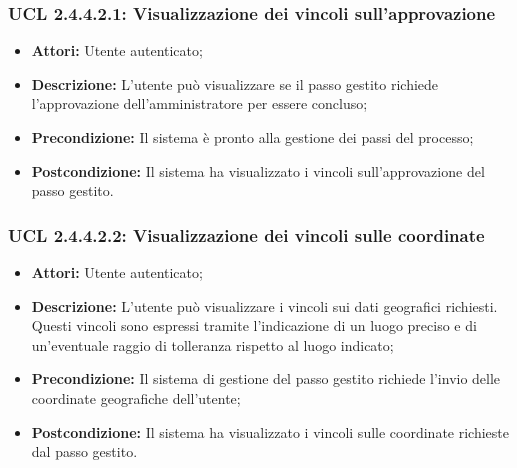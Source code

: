 \hypertarget{L2.4.4.2.1}{}
\subsubsection{UCL 2.4.4.2.1: Visualizzazione dei vincoli sull'approvazione}
\begin{itemize}
\item \textbf{Attori:} Utente autenticato;
\item \textbf{Descrizione:} L'utente può visualizzare se il passo gestito richiede l'approvazione dell'amministratore per essere concluso;
\item \textbf{Precondizione:} Il sistema è pronto alla gestione dei passi del processo;
\item \textbf{Postcondizione:} Il sistema ha visualizzato i vincoli sull'approvazione del passo gestito.
\end{itemize}

\hypertarget{L2.4.4.2.2}{}
\subsubsection{UCL 2.4.4.2.2: Visualizzazione dei vincoli sulle coordinate}
\begin{itemize}
\item \textbf{Attori:} Utente autenticato;
\item \textbf{Descrizione:} L'utente può visualizzare i vincoli sui dati geografici richiesti. Questi vincoli sono espressi tramite l'indicazione di un luogo preciso e di un'eventuale raggio di tolleranza rispetto al luogo indicato;
\item \textbf{Precondizione:} Il sistema di gestione del passo gestito richiede l'invio delle coordinate geografiche dell'utente;
\item \textbf{Postcondizione:} Il sistema ha visualizzato i vincoli sulle coordinate richieste dal passo gestito.
\end{itemize}


